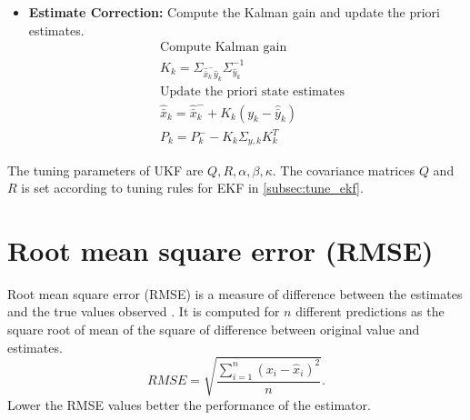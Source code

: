 \begin{itemize}
\begin{itemize}
        \item \textbf{Estimate Correction:} Compute the Kalman gain and update the priori estimates.
        \begin{equation}
        \begin{split}
        &\text{Compute Kalman gain}\\
        &K_k = \Sigma_{\hat{\bar x}_k^- \hat y_k} \Sigma_{\hat y_k}^{-1}\\
        &\text{Update the priori state estimates}\\
        &\hat{\bar{x}}_k = \hat{\bar{x}}_k^- + K_k(y_k - \hat{\bar y}_k)\\
        &P_k = P_k^- - K_k \Sigma_{y,k} K_k^T
        \end{split}
        \end{equation}
    \end{itemize}
\end{itemize}

The tuning parameters of UKF are $Q,R,\alpha,\beta,\kappa$. The covariance matrices $Q$ and $R$ is set according to tuning rules for EKF in \ref{subsec:tune_ekf}.
\section{Root mean square error (RMSE)}
Root mean square error (RMSE) is a measure of difference between the estimates and the true values observed \citep{hyn06}. It is computed for $n$ different predictions as the square root of mean of the square of difference between original value and estimates.
\begin{equation}
    \label{eq:rmse}
    RMSE = \sqrt{\frac{\sum_{i=1}^n (x_i - \hat x_i)^2}{n}}.
\end{equation}
Lower the RMSE values better the performance of the estimator.
